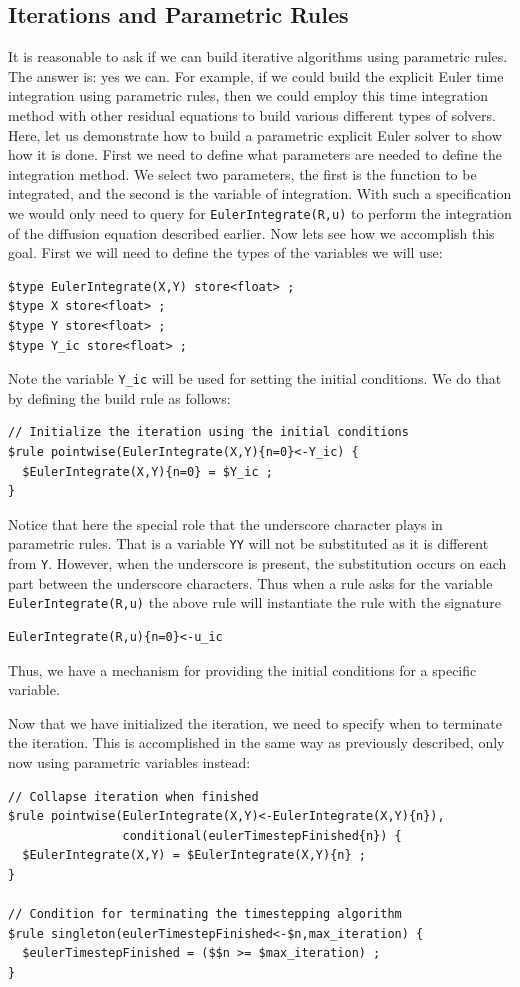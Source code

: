 \documentclass[10pt,epsf,letterpaper,twoside]{book}
\begin{document}
\subsection{Iterations and Parametric Rules}

It is reasonable to ask if we can build iterative algorithms using
parametric rules.  The answer is: yes we can.  For example, if we could
build the explicit Euler time integration using parametric rules, then
we could employ this time integration method with other residual
equations to build various different types of solvers.  Here, let us
demonstrate how to build a parametric explicit Euler solver to show
how it is done.  First we need to define what parameters are needed to
define the integration method.  We select two parameters, the first is
the function to be integrated, and the second is the variable of
integration.  With such a specification we would only need to query
for {\tt EulerIntegrate(R,u)} to perform the integration of the
diffusion equation described earlier.  Now lets see how we accomplish
this goal.  First we will need to define the types of the variables we
will use:

\begin{verbatim}
$type EulerIntegrate(X,Y) store<float> ;
$type X store<float> ;
$type Y store<float> ;
$type Y_ic store<float> ;
\end{verbatim}

Note the variable {\tt Y\_ic} will be used for setting the initial
conditions.  We do that by defining the build rule as follows:
\begin{verbatim}
// Initialize the iteration using the initial conditions
$rule pointwise(EulerIntegrate(X,Y){n=0}<-Y_ic) {
  $EulerIntegrate(X,Y){n=0} = $Y_ic ;
}
\end{verbatim}
Notice that here the special role that the underscore character plays
in parametric rules.  That is a variable {\tt YY} will not be
substituted as it is different from {\tt Y}.  However, when the
underscore is present, the substitution occurs on each part between
the underscore characters.  Thus when a rule asks for the variable
{\tt EulerIntegrate(R,u)} the above rule will instantiate the rule
with the signature
\begin{verbatim}
EulerIntegrate(R,u){n=0}<-u_ic
\end{verbatim}
Thus, we have a mechanism for providing the initial conditions for a
specific variable.

Now that we have initialized the iteration, we need to specify when to
terminate the iteration.  This is accomplished in the same way as
previously described, only now using parametric variables instead:
\begin{verbatim}
// Collapse iteration when finished
$rule pointwise(EulerIntegrate(X,Y)<-EulerIntegrate(X,Y){n}),
                conditional(eulerTimestepFinished{n}) {
  $EulerIntegrate(X,Y) = $EulerIntegrate(X,Y){n} ;
}

// Condition for terminating the timestepping algorithm
$rule singleton(eulerTimestepFinished<-$n,max_iteration) {
  $eulerTimestepFinished = ($$n >= $max_iteration) ;
}
\end{verbatim}
\end{document}
